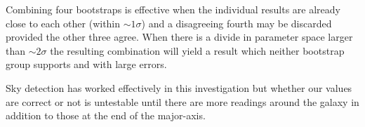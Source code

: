 Combining four bootstraps is effective when the individual results are already close to each other (within $\sim 1\sigma$) and a disagreeing fourth may be discarded provided the other three agree. When there is a divide in parameter space larger than $\sim 2\sigma$ the resulting combination will yield a result which neither bootstrap group supports and with large errors. 

Sky detection has worked effectively in this investigation but whether our values are correct or not is untestable until there are more readings around the galaxy in addition to those at the end of the major-axis. 